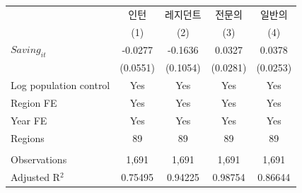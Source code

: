 \begingroup
\centering
\begin{tabular}{lcccc}
   \toprule
                          & 인턴     & 레지던트 & 전문의   & 일반의 \\   
                          & (1)      & (2)      & (3)      & (4)\\  
   \midrule 
   $Saving_{it}$          & -0.0277  & -0.1636  & 0.0327   & 0.0378\\   
                          & (0.0551) & (0.1054) & (0.0281) & (0.0253)\\   
   Log population control & Yes      & Yes      & Yes      & Yes\\  
   Region FE              & Yes      & Yes      & Yes      & Yes\\  
   Year FE                & Yes      & Yes      & Yes      & Yes\\  
   Regions                & 89       & 89       & 89       & 89\\  
    \\
   Observations           & 1,691    & 1,691    & 1,691    & 1,691\\  
   Adjusted R$^2$         & 0.75495  & 0.94225  & 0.98754  & 0.86644\\  
   \bottomrule
\end{tabular}
\par\endgroup
